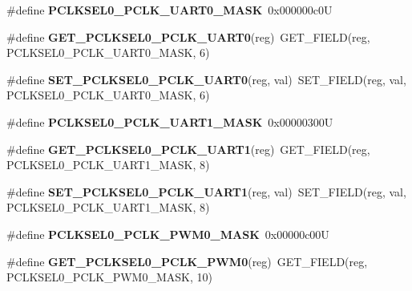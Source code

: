 \begin{DoxyCompactItemize}
\#define {\bfseries P\+C\+L\+K\+S\+E\+L0\+\_\+\+P\+C\+L\+K\+\_\+\+U\+A\+R\+T0\+\_\+\+M\+A\+SK}~0x000000c0U
\item 
\mbox{\label{group__lpc24xx__regs_gaa6fa713e5ecf5fae61062ae153dea8d6}} 
\#define {\bfseries G\+E\+T\+\_\+\+P\+C\+L\+K\+S\+E\+L0\+\_\+\+P\+C\+L\+K\+\_\+\+U\+A\+R\+T0}(reg)~G\+E\+T\+\_\+\+F\+I\+E\+LD(reg, P\+C\+L\+K\+S\+E\+L0\+\_\+\+P\+C\+L\+K\+\_\+\+U\+A\+R\+T0\+\_\+\+M\+A\+SK, 6)
\item 
\mbox{\label{group__lpc24xx__regs_ga88f71b2e67e60db11bbc28a03835b9fc}} 
\#define {\bfseries S\+E\+T\+\_\+\+P\+C\+L\+K\+S\+E\+L0\+\_\+\+P\+C\+L\+K\+\_\+\+U\+A\+R\+T0}(reg,  val)~S\+E\+T\+\_\+\+F\+I\+E\+LD(reg, val, P\+C\+L\+K\+S\+E\+L0\+\_\+\+P\+C\+L\+K\+\_\+\+U\+A\+R\+T0\+\_\+\+M\+A\+SK, 6)
\item 
\mbox{\label{group__lpc24xx__regs_ga31a16c2e127aa63009864118da37d5bb}} 
\#define {\bfseries P\+C\+L\+K\+S\+E\+L0\+\_\+\+P\+C\+L\+K\+\_\+\+U\+A\+R\+T1\+\_\+\+M\+A\+SK}~0x00000300U
\item 
\mbox{\label{group__lpc24xx__regs_ga9f1de5814a2ae25c54a774211de3703d}} 
\#define {\bfseries G\+E\+T\+\_\+\+P\+C\+L\+K\+S\+E\+L0\+\_\+\+P\+C\+L\+K\+\_\+\+U\+A\+R\+T1}(reg)~G\+E\+T\+\_\+\+F\+I\+E\+LD(reg, P\+C\+L\+K\+S\+E\+L0\+\_\+\+P\+C\+L\+K\+\_\+\+U\+A\+R\+T1\+\_\+\+M\+A\+SK, 8)
\item 
\mbox{\label{group__lpc24xx__regs_gaa9c8ae40f5c085bffd6088de6f99c1a3}} 
\#define {\bfseries S\+E\+T\+\_\+\+P\+C\+L\+K\+S\+E\+L0\+\_\+\+P\+C\+L\+K\+\_\+\+U\+A\+R\+T1}(reg,  val)~S\+E\+T\+\_\+\+F\+I\+E\+LD(reg, val, P\+C\+L\+K\+S\+E\+L0\+\_\+\+P\+C\+L\+K\+\_\+\+U\+A\+R\+T1\+\_\+\+M\+A\+SK, 8)
\item 
\mbox{\label{group__lpc24xx__regs_gafd68609a3a301b41f47852047ee31a94}} 
\#define {\bfseries P\+C\+L\+K\+S\+E\+L0\+\_\+\+P\+C\+L\+K\+\_\+\+P\+W\+M0\+\_\+\+M\+A\+SK}~0x00000c00U
\item 
\mbox{\label{group__lpc24xx__regs_ga45ec880ef29af1e8c5b058a0040ad159}} 
\#define {\bfseries G\+E\+T\+\_\+\+P\+C\+L\+K\+S\+E\+L0\+\_\+\+P\+C\+L\+K\+\_\+\+P\+W\+M0}(reg)~G\+E\+T\+\_\+\+F\+I\+E\+LD(reg, P\+C\+L\+K\+S\+E\+L0\+\_\+\+P\+C\+L\+K\+\_\+\+P\+W\+M0\+\_\+\+M\+A\+SK, 10)

\end{DoxyCompactItemize}
